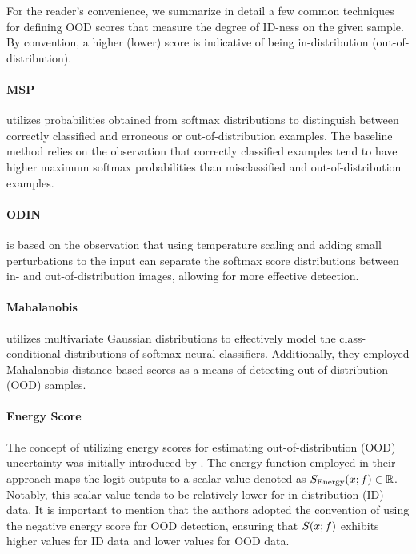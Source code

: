 \documentclass{article}
\begin{document}
For the reader's convenience, we summarize in detail a few common techniques for defining OOD scores that measure the degree of ID-ness on the given sample.
By convention, a higher (lower) score is indicative of being in-distribution (out-of-distribution).









\paragraph{MSP~\cite{hendrycks17baseline}} utilizes probabilities obtained from softmax distributions to distinguish between correctly classified and erroneous or out-of-distribution examples. The baseline method relies on the observation that correctly classified examples tend to have higher maximum softmax probabilities than misclassified and out-of-distribution examples. 


\paragraph{ODIN~\cite{liang2018enhancing}} is based on the observation that using temperature scaling and adding small perturbations to the input can separate the softmax score distributions between in- and out-of-distribution images, allowing for more effective detection. 

\paragraph{Mahalanobis~\cite{lee2018simple}} utilizes multivariate Gaussian distributions to effectively model the class-conditional distributions of softmax neural classifiers. Additionally, they employed Mahalanobis distance-based scores as a means of detecting out-of-distribution (OOD) samples. 

\paragraph{Energy Score~\cite{liu2020energy}} 
The concept of utilizing energy scores for estimating out-of-distribution (OOD) uncertainty was initially introduced by \citeauthor{liu2020energy}. The energy function employed in their approach maps the logit outputs to a scalar value denoted as $S_\mathrm{Energy}(\*x; f) \in \mathbb{R}$. Notably, this scalar value tends to be relatively lower for in-distribution (ID) data. It is important to mention that the authors adopted the convention of using the negative energy score for OOD detection, ensuring that $S(\*x;f)$ exhibits higher values for ID data and lower values for OOD data.
\end{document}
